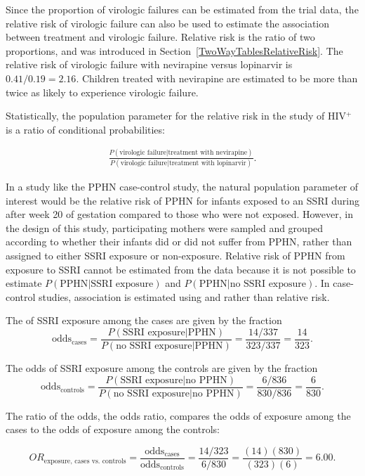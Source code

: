 Since the proportion of virologic failures can be estimated from the trial data, the relative risk of virologic failure can also be used to estimate the association between treatment and virologic failure. Relative risk is the ratio of two proportions, and was introduced in Section~\ref{TwoWayTablesRelativeRisk}.  The relative risk of virologic failure with nevirapine versus lopinarvir is $0.41/0.19 = 2.16$.  Children treated with nevirapine are estimated to be more than twice as likely to experience virologic failure.  

Statistically, the population parameter for the relative risk in the study of HIV$^+$ is a ratio of conditional probabilities:

\begin{align*}
  \frac{P(\text{virologic failure}| \text{treatment with nevirapine})}
  {P(\text{virologic failure}|\text{treatment with lopinarvir})}.
\end{align*}

In a study like the PPHN case-control study, the natural population parameter of interest would be the relative risk of PPHN for infants exposed to an SSRI during after week 20 of gestation compared to those who were not exposed. However, in the design of this study, participating mothers were sampled and grouped according to whether their infants did or did not suffer from PPHN, rather than assigned to either SSRI exposure or non-exposure. Relative risk of PPHN from exposure to SSRI cannot be estimated from the data because it is not possible to estimate $P(\text{PPHN} | \text{SSRI exposure})$ and $P(\text{PPHN} | \text{no SSRI exposure})$. In case-control studies, association is estimated using  and  rather than relative risk.

The  of SSRI exposure among the cases are given by the fraction
\[
  \text{odds$_\text{cases}$} = \frac{P(\text{SSRI exposure} | \text{PPHN})}
  {P(\text{no SSRI exposure} | \text{PPHN})} = \frac{14/337}{323/337} = \frac{14}{323}.
\]

The odds of SSRI exposure among the controls are given by the fraction
\[
  \text{odds$_\text{controls}$} = \frac{P(\text{SSRI exposure} | \text{no PPHN})}
  {P(\text{no SSRI exposure} | \text{no PPHN})} = \frac{6/836}{830/836} = \frac{6}{830}.
\]

The ratio of the odds, the odds ratio, compares the odds of exposure among the cases to the odds of exposure among the controls: 

\[OR_{\text{exposure, cases vs. controls}} = \frac{\text{odds$_\text{cases}$}}{\text{odds$_\text{controls}$}} = \frac{14/323}{6/830} = \frac{(14)(830)}{(323)(6)} =  6.00. \]

